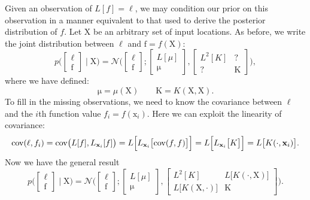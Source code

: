 \documentclass{article}
\newcommand{\given}{\mid}
\newcommand{\mc}[1]{\mathcal{#1}}
\newcommand{\mat}[1]{\bm{\mathrm{#1}}}
\renewcommand{\vec}[1]{\bm{\mathrm{#1}}}
\DeclareMathOperator{\cov}{cov}
\begin{document}
Given an observation of $L[f] = \ell$, we may condition our prior on
this observation in a manner equivalent to that used to derive the
posterior distribution of $f$.  Let $\mat{X}$ be an arbitrary set of
input locations.  As before, we write the joint distribution between
$\ell$ and $\vec{f} = f(\mat{X})$:
\begin{equation*}
  p\Biggl(
  \begin{bmatrix}
    \ell
    \\
    \vec{f}
  \end{bmatrix}
  \given
  \vec{X}
  \Biggr)
  =
  \mc{N}
  \Biggl(
  \begin{bmatrix}
    \ell
    \\
    \vec{f}
  \end{bmatrix}
  ;
  \begin{bmatrix}
    L[\mu]
    \\
    \vec{\mu}
  \end{bmatrix}
  ,
  \begin{bmatrix}
    L^2[K] & \text{?}
    \\
    \text{?} & \mat{K}
  \end{bmatrix}
  \Biggr),
\end{equation*}
where we have defined:
\begin{equation*}
  \vec{\mu} = \mu(\mat{X})
  \qquad
  \mat{K} = K(\mat{X}, \mat{X}).
\end{equation*}
To fill in the missing observations, we need to know the covariance
between $\ell$ and the $i$th function value $f_i = f(\vec{x}_i)$.  Here
we can exploit the linearity of covariance:
\begin{equation*}
  \cov(\ell, f_i)
  =
  \cov\bigl(L[f], L_{\vec{x}_i}[f]\bigr)
  =
  L\Bigl[L_{\vec{x}_i}\bigl[
      \cov(f, f)
  \bigr]\Bigr]
  =
  L\Bigl[L_{\vec{x}_i}\bigl[
      K
  \bigr]\Bigr]
  =
  L\bigl[K(\cdot, \vec{x}_i)\bigr].
\end{equation*}
Now we have the general result
\begin{equation*}
  p\Biggl(
  \begin{bmatrix}
    \ell
    \\
    \vec{f}
  \end{bmatrix}
  \given
  \vec{X}
  \Biggr)
  =
  \mc{N}
  \Biggl(
  \begin{bmatrix}
    \ell
    \\
    \vec{f}
  \end{bmatrix}
  ;
  \begin{bmatrix}
    L[\mu]
    \\
    \vec{\mu}
  \end{bmatrix}
  ,
  \begin{bmatrix}
    L^2[K] & L\bigl[K(\cdot, \mat{X})\bigr]
    \\
    L\bigl[K(\mat{X}, \cdot)\bigr] & \mat{K}
  \end{bmatrix}
  \Biggr).
\end{equation*}
\end{document}
